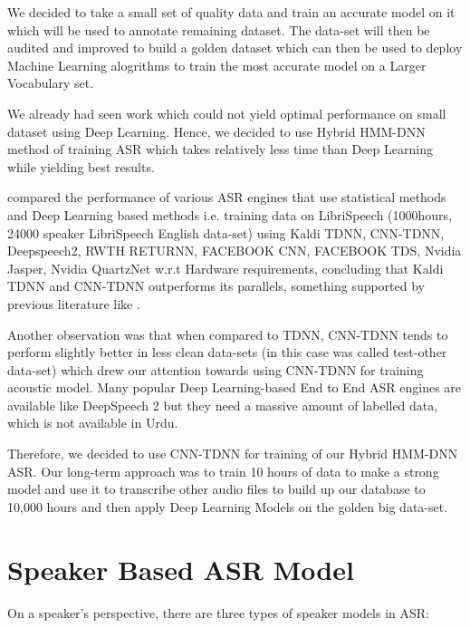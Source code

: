 We decided to take a small set of quality data and train an accurate model on it which will be used to annotate remaining dataset. The data-set will then be audited and improved to build a golden dataset which can then be used to deploy Machine Learning alogrithms to train the most accurate model on a Larger Vocabulary set.

We already had seen \cite{sehar_gul_detecting_2020} work which could not yield optimal performance on small dataset using Deep Learning. Hence, we decided to use Hybrid HMM-DNN method of training ASR which takes relatively less time than Deep Learning while yielding best results.

\cite{georgescu_performance_2021} compared the performance of various ASR engines that use statistical methods and Deep Learning based methods i.e. training data on LibriSpeech (1000hours, 24000 speaker LibriSpeech English data-set) using Kaldi TDNN, CNN-TDNN, Deepspeech2, RWTH RETURNN, FACEBOOK CNN, FACEBOOK TDS, Nvidia Jasper, Nvidia QuartzNet w.r.t Hardware requirements, concluding that Kaldi \cite{daniel_povey_kaldi_nodate} TDNN and CNN-TDNN outperforms its parallels, something supported by previous literature like \cite{christian_gaida_comparing_2014}. 

Another observation was that when compared to TDNN, CNN-TDNN tends to perform slightly better in less clean data-sets (in this case was called test-other data-set) which drew our attention towards using CNN-TDNN for training acoustic model. Many popular Deep Learning-based End to End ASR engines are available like DeepSpeech 2 \cite{amodei_deep_2015-1} but they need a massive amount of labelled data, which is not available in Urdu. 

Therefore, we decided to use CNN-TDNN for training of our Hybrid HMM-DNN ASR. Our long-term approach was to train 10 hours of data to make a strong model and use it to transcribe other audio files to build up our database to 10,000 hours and then apply Deep Learning Models on the golden big data-set.

\section{Speaker Based ASR Model}
\label{sec:spkr-based-asr}

On a speaker's perspective, there are three types of speaker models in ASR:

